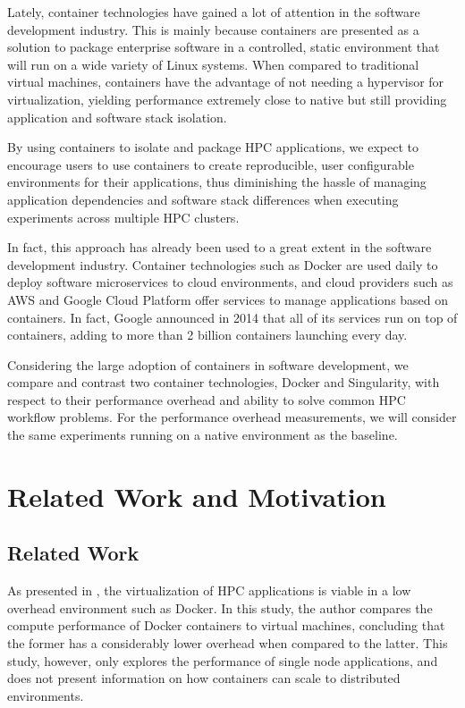 \documentclass[12pt]{article}
\begin{document}
Lately, container technologies have gained a lot of attention in the software development industry. This is mainly because containers are presented as a solution to package enterprise software in a controlled, static environment that will run on a wide variety of Linux systems. When compared to traditional virtual machines, containers have the advantage of not needing a hypervisor for virtualization, yielding performance extremely close to native but still providing application and software stack isolation.

By using containers to isolate and package HPC applications, we expect to encourage users to use containers to create reproducible, user configurable environments for their applications, thus diminishing the hassle of managing application dependencies and software stack differences when executing experiments across multiple HPC clusters.

In fact, this approach has already been used to a great extent in the software development industry. Container technologies such as Docker are used daily to deploy software microservices to cloud environments, and cloud providers such as AWS and Google Cloud Platform offer services to manage applications based on containers. In fact, Google announced in 2014 that all of its services run on top of containers, adding to more than 2 billion containers launching every day.

Considering the large adoption of containers in software development, we compare and contrast two container technologies, Docker and Singularity, with respect to their performance overhead and ability to solve common HPC workflow problems. For the performance overhead measurements, we will consider the same experiments running on a native environment as the baseline.

\section{Related Work and Motivation} \label{sec.relatedwork}
\subsection{Related Work}
As presented in \cite{7562612}, the virtualization of HPC applications is viable in a low overhead environment such as Docker. In this study, the author compares the compute performance of Docker containers to virtual machines, concluding that the former has a considerably lower overhead when compared to the latter. This study, however, only explores the performance of single node applications, and does not present information on how containers can scale to distributed environments.
\end{document}
